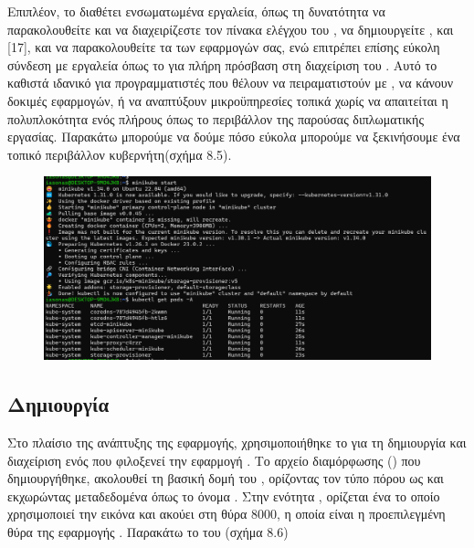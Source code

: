 Επιπλέον, το  
διαθέτει ενσωματωμένα εργαλεία, όπως τη δυνατότητα να παρακολουθείτε
και να διαχειρίζεστε τον πίνακα ελέγχου του , 
να δημιουργείτε , και [17], και 
να παρακολουθείτε τα  των εφαρμογών σας, ενώ επιτρέπει 
επίσης εύκολη σύνδεση με εργαλεία όπως το  
για πλήρη πρόσβαση στη διαχείριση του . 
Αυτό το καθιστά ιδανικό για προγραμματιστές που θέλουν να 
πειραματιστούν με , 
να κάνουν δοκιμές εφαρμογών, ή να αναπτύξουν μικροϋπηρεσίες 
τοπικά χωρίς να απαιτείται η πολυπλοκότητα ενός πλήρους 
όπως το περιβάλλον της παρούσας διπλωματικής εργασίας. Παρακάτω μπορούμε να δούμε 
πόσο εύκολα μπορούμε να ξεκινήσουμε ένα τοπικό περιβάλλον κυβερνήτη(σχήμα 8.5).


\begin{figure}[h]
	\centering
	\includegraphics[width=1.5\textwidth]{graphics/minikube_deployment_k8s.png}
	\caption{}
\end{figure}

\subsection{Δημιουργία }

Στο πλαίσιο της ανάπτυξης της εφαρμογής, χρησιμοποιήθηκε το 
 για τη δημιουργία και διαχείριση ενός  
που φιλοξενεί την εφαρμογή . Το αρχείο διαμόρφωσης 
() που δημιουργήθηκε, ακολουθεί τη βασική δομή του , 
ορίζοντας τον τύπο πόρου ως  και 
εκχωρώντας μεταδεδομένα όπως το όνομα . 
Στην ενότητα , ορίζεται ένα  
το οποίο χρησιμοποιεί την εικόνα  
και ακούει στη θύρα 8000, η οποία είναι η προεπιλεγμένη θύρα της 
εφαρμογής . Παρακάτω το  του (σχήμα 8.6)

